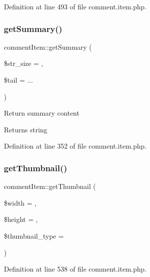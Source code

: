Definition at line 493 of file comment.\+item.\+php.

\mbox{\label{classcommentItem_a3705efbd1d15d8defc8e4ec371daf01b}} 
\subsubsection{\texorpdfstring{get\+Summary()}{getSummary()}}
{\footnotesize\ttfamily comment\+Item\+::get\+Summary (\begin{DoxyParamCaption}\item[{}]{\$str\+\_\+size = {},  }\item[{}]{\$tail = {\ttfamily \textquotesingle{}...\textquotesingle{}} }\end{DoxyParamCaption})}

Return summary content \begin{DoxyReturn}{Returns}
string 
\end{DoxyReturn}


Definition at line 352 of file comment.\+item.\+php.

\mbox{\label{classcommentItem_a4a4175f24e633332e57bdada6f75ffdf}} 
\subsubsection{\texorpdfstring{get\+Thumbnail()}{getThumbnail()}}
{\footnotesize\ttfamily comment\+Item\+::get\+Thumbnail (\begin{DoxyParamCaption}\item[{}]{\$width = {},  }\item[{}]{\$height = {},  }\item[{}]{\$thumbnail\+\_\+type = {\ttfamily \textquotesingle{}\textquotesingle{}} }\end{DoxyParamCaption})}



Definition at line 538 of file comment.\+item.\+php.

\mbox{\label{classcommentItem_a688fe6f0328ed3f28f72104943d5c335}} 

